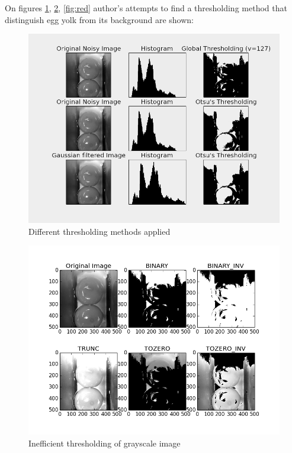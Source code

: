 \documentclass[12pt,twoside,a4paper]{article}
\begin{document}
On figures \ref{fig:diffthr}, \ref{fig:gray}, \ref{fig:red} author's attempts to find a thresholding method that distinguish egg yolk from its background are shown:

\begin{figure}[H]
\centering
\includegraphics[width=0.6\paperwidth]{diffthr}
\caption{Different thresholding methods applied}\label{fig:diffthr}
\end{figure}

\begin{figure}[H]
\centering
\includegraphics[width=0.6\paperwidth]{gray}
\caption{Inefficient thresholding of grayscale image}\label{fig:gray}
\end{figure}
\end{document}

